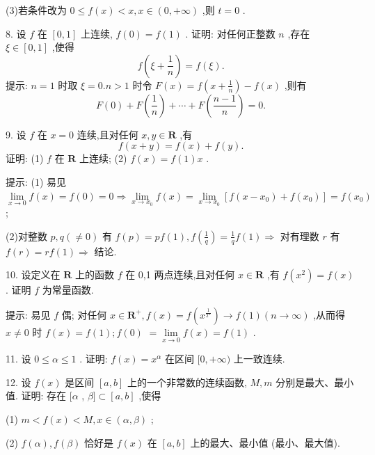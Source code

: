 (3)若条件改为 \(0 \leq  f\left( x\right)  < x,x \in  \left( {0, + \infty }\right)\) ,则 \(t = 0\) .

8. 设 \(f\) 在 \(\left\lbrack  {0,1}\right\rbrack\) 上连续, \(f\left( 0\right)  = f\left( 1\right)\) . 证明: 对任何正整数 \(n\) ,存在 \(\xi  \in  \left\lbrack  {0,1}\right\rbrack\) ,使得
\[
f\left( {\xi  + \frac{1}{n}}\right)  = f\left( \xi \right) .
\]
提示: \(n = 1\) 时取 \(\xi  = 0.n > 1\) 时令 \(F\left( x\right)  = f\left( {x + \frac{1}{n}}\right)  - f\left( x\right)\) ,则有
\[
F\left( 0\right)  + F\left( \frac{1}{n}\right)  + \cdots  + F\left( \frac{n - 1}{n}\right)  = 0.
\]

9. 设 \(f\) 在 \(x = 0\) 连续,且对任何 \(x,y \in  \mathbf{R}\) ,有
\[
f\left( {x + y}\right)  = f\left( x\right)  + f\left( y\right) .
\]
证明: (1) \(f\) 在 \(\mathbf{R}\) 上连续; (2) \(f\left( x\right)  = f\left( 1\right) x\) .

提示: (1) 易见 \(\mathop{\lim }\limits_{{x \rightarrow  0}}f\left( x\right)  = f\left( 0\right)  = 0 \Rightarrow  \mathop{\lim }\limits_{{x \rightarrow  {x}_{0}}}f\left( x\right)  = \mathop{\lim }\limits_{{x \rightarrow  {x}_{0}}}\left\lbrack  {f\left( {x - {x}_{0}}\right)  + f\left( {x}_{0}\right) }\right\rbrack   = f\left( {x}_{0}\right)\) ;

(2)对整数 \(p,q\left( { \neq  0}\right)\) 有 \(f\left( p\right)  = {pf}\left( 1\right) ,f\left( \frac{1}{q}\right)  = \frac{1}{q}f\left( 1\right)  \Rightarrow\) 对有理数 \(r\) 有 \(f\left( r\right)  = {rf}\left( 1\right)  \Rightarrow\) 结论.

10. 设定义在 \(\mathbf{R}\) 上的函数 \(f\) 在 0,1 两点连续,且对任何 \(x \in  \mathbf{R}\) ,有 \(f\left( {x}^{2}\right)  = f\left( x\right)\) . 证明 \(f\) 为常量函数.

提示: 易见 \(f\) 偶; 对任何 \(x \in  {\mathbf{R}}^{ + },f\left( x\right)  = f\left( {x}^{\frac{1}{{2}^{n}}}\right)  \rightarrow  f\left( 1\right) \left( {n \rightarrow  \infty }\right)\) ,从而得 \(x \neq  0\) 时 \(f\left( x\right)  = f\left( 1\right) ;f\left( 0\right)\)  \(= \mathop{\lim }\limits_{{x \rightarrow  0}}f\left( x\right)  = f\left( 1\right)\) .

11. 设 \(0 \leq  \alpha  \leq  1\) . 证明: \(f\left( x\right)  = {x}^{\alpha }\) 在区间 \(\lbrack 0, + \infty )\) 上一致连续.

12. 设 \(f\left( x\right)\) 是区间 \(\left\lbrack  {a,b}\right\rbrack\) 上的一个非常数的连续函数, \(M,m\) 分别是最大、最小值. 证明: 存在 \(\lbrack \alpha\) , \(\beta \rbrack  \subset  \left\lbrack  {a,b}\right\rbrack\) ,使得

(1) \(m < f\left( x\right)  < M,x \in  \left( {\alpha ,\beta }\right)\) ;

(2) \(f\left( \alpha \right) ,f\left( \beta \right)\) 恰好是 \(f\left( x\right)\) 在 \(\left\lbrack  {a,b}\right\rbrack\) 上的最大、最小值 (最小、最大值).
